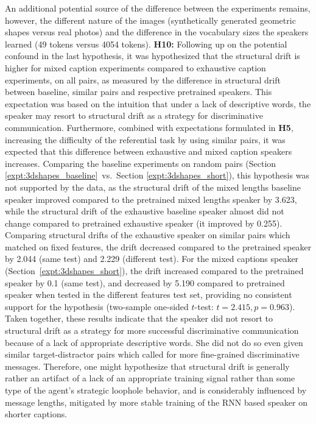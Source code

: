 An additional potential source of the difference between the experiments remains, however, the different nature of the images (synthetically generated geometric shapes versus real photos) and the difference in the vocabulary sizes the speakers learned (49 tokens versus 4054 tokens). \newline
\textbf{H10:} Following up on the potential confound in the last hypothesis, it was hypothesized that the structural drift is higher for mixed caption experiments compared to exhaustive caption experiments, on all pairs, as measured by the difference in structural drift between baseline, similar pairs and respective pretrained speakers. This expectation was based on the intuition that under a lack of descriptive words, the speaker may resort to structural drift as a strategy for discriminative communication. Furthermore, combined with expectations formulated in \textbf{H5}, increasing the difficulty of the referential task by using similar pairs, it was expected that this difference between exhaustive and mixed caption speakers increases. 
Comparing the baseline experiments on random pairs (Section \ref{expt:3dshapes_baseline}~vs.~Section \ref{expt:3dshapes_short}), this hypothesis was not supported by the data, as the structural drift of the mixed lengths baseline speaker improved compared to the pretrained mixed lengths speaker by 3.623, while the structural drift of the exhaustive baseline speaker almost did not change compared to pretrained exhaustive speaker (it improved by 0.255). %
Comparing structural drifts of the exhaustive speaker on similar pairs which matched on fixed features, the drift decreased compared to the pretrained speaker by 2.044 (same test) and 2.229 (different test). For the mixed captions speaker (Section~\ref{expt:3dshapes_short}), the drift increased compared to the pretrained speaker by 0.1 (same test), and decreased by 5.190 compared to pretrained speaker when tested in the different features test set, providing no consistent support for the hypothesis (two-sample one-sided $t$-test: $t=2.415, p=0.963$). Taken together, these results indicate that the speaker did not resort to structural drift as a strategy for more successful discriminative communication because of a lack of appropriate descriptive words. She did not do so even given similar target-distractor pairs which called for more fine-grained discriminative messages. Therefore, one might hypothesize that structural drift is generally rather an artifact of a lack of an appropriate training signal rather than some type of the agent's strategic loophole behavior, and is considerably influenced by message lengths, mitigated by more stable training of the RNN based speaker on shorter captions. 
\newline

